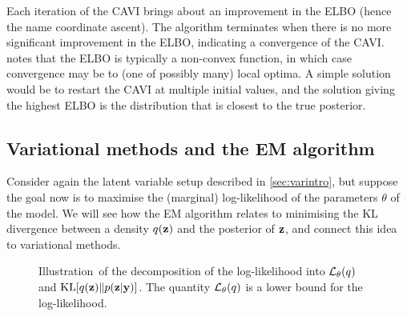 Each iteration of the CAVI brings about an improvement in the ELBO (hence the name coordinate ascent).
The algorithm terminates when there is no more significant improvement in the ELBO, indicating a convergence of the CAVI.
\citet{blei2017variational} notes that the ELBO is typically a non-convex function, in which case convergence may be to (one of possibly many) local optima.
A simple solution would be to restart the CAVI at multiple initial values, and the solution giving the highest ELBO is the distribution that is closest to the true posterior.

\subsection{Variational methods and the EM algorithm}
\label{sec:varEM}


Consider again the latent variable setup described in \cref{sec:varintro}, but suppose the goal now is to maximise the (marginal) log-likelihood of the parameters $\theta$ of the model.
We will see how the EM algorithm relates to minimising the KL divergence between a density $q({\mathbf z})$ and the posterior of ${\mathbf z}$, and connect this idea to variational methods.

\begin{figure}[t]
  \centering
  \energyem 
  \caption[Illustration of the decomposition of the log likelihood.]{Illustration\footnotemark~of the decomposition of the log-likelihood into ${\mathcal L}_\theta(q)$ and $\operatorname{KL}[q({\mathbf z}) \Vert p({\mathbf z}|{\mathbf y})]$. The quantity ${\mathcal L}_\theta(q)$ is a lower bound for the log-likelihood.}
  \label{fig:loglikdecomp}
\end{figure}

